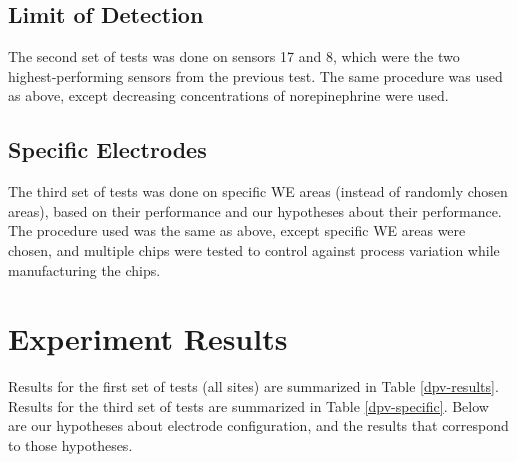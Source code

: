 \subsection{Limit of Detection}

The second set of tests was done on sensors 17 and 8, which were the two highest-performing sensors from the previous test. The same procedure was used as above, except decreasing concentrations of norepinephrine were used.

\subsection{Specific Electrodes}

The third set of tests was done on specific WE areas (instead of randomly chosen areas), based on their performance and our hypotheses about their performance. The procedure used was the same as above, except specific WE areas were chosen, and multiple chips were tested to control against process variation while manufacturing the chips.

\section{Experiment Results}

Results for the first set of tests (all sites) are summarized in Table \ref{dpv-results}. Results for the third set of tests are summarized in Table \ref{dpv-specific}. Below are our hypotheses about electrode configuration, and the results that correspond to those hypotheses.

